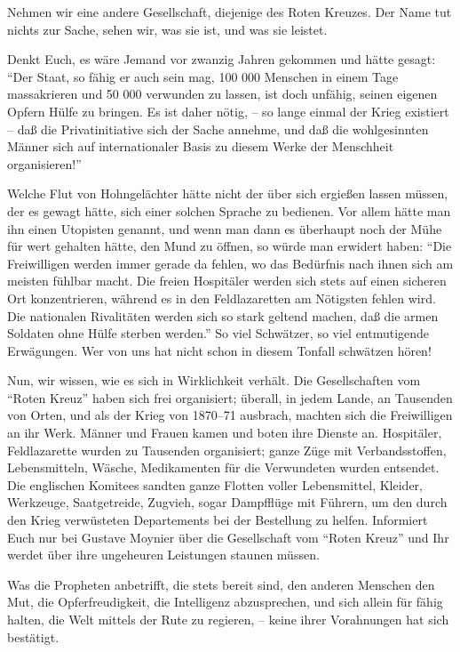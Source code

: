 \documentclass{scrbook}
\begin{document}
Nehmen wir eine andere Gesellschaft, diejenige des Roten Kreuzes. Der Name tut nichts zur Sache, sehen wir, was sie ist, und was sie leistet.

Denkt Euch, es wäre Jemand vor zwanzig Jahren gekommen und hätte gesagt: ``Der Staat, so fähig er auch sein mag, 100 000 Menschen in einem Tage massakrieren und 50 000 verwunden zu lassen, ist doch unfähig, seinen eigenen Opfern Hülfe zu bringen. Es ist daher nötig, – so lange einmal der Krieg existiert – daß die Privatinitiative sich der Sache annehme, und daß die wohlgesinnten Männer sich auf internationaler Basis zu diesem Werke der Menschheit organisieren!''

Welche Flut von Hohngelächter hätte nicht der über sich ergießen lassen müssen, der es gewagt hätte, sich einer solchen Sprache zu bedienen. Vor allem hätte man ihn einen Utopisten genannt, und wenn man dann es überhaupt noch der Mühe für wert gehalten hätte, den Mund zu öffnen, so würde man erwidert haben: ``Die Freiwilligen werden immer gerade da fehlen, wo das Bedürfnis nach ihnen sich am meisten fühlbar macht. Die freien Hospitäler werden sich stets auf einen sicheren Ort konzentrieren, während es in den Feldlazaretten am Nötigsten fehlen wird. Die nationalen Rivalitäten werden sich so stark geltend machen, daß die armen Soldaten ohne Hülfe sterben werden.'' So viel Schwätzer, so viel entmutigende Erwägungen. Wer von uns hat nicht schon in diesem Tonfall schwätzen hören!

Nun, wir wissen, wie es sich in Wirklichkeit verhält. Die Gesellschaften vom ``Roten Kreuz'' haben sich frei organisiert; überall, in jedem Lande, an Tausenden von Orten, und als der Krieg von 1870–71 ausbrach, machten sich die Freiwilligen an ihr Werk. Männer und Frauen kamen und boten ihre Dienste an. Hospitäler, Feldlazarette wurden zu Tausenden organisiert; ganze Züge mit Verbandsstoffen, Lebensmitteln, Wäsche, Medikamenten für die Verwundeten wurden entsendet. Die englischen Komitees sandten ganze Flotten voller Lebensmittel, Kleider, Werkzeuge, Saatgetreide, Zugvieh, sogar Dampfflüge mit Führern, um den durch den Krieg verwüsteten Departements bei der Bestellung zu helfen. Informiert Euch nur bei Gustave Moynier über die Gesellschaft vom ``Roten Kreuz'' und Ihr werdet über ihre ungeheuren Leistungen staunen müssen.

Was die Propheten anbetrifft, die stets bereit sind, den anderen Menschen den Mut, die Opferfreudigkeit, die Intelligenz abzusprechen, und sich allein für fähig halten, die Welt mittels der Rute zu regieren, – keine ihrer Vorahnungen hat sich bestätigt.
\end{document}
